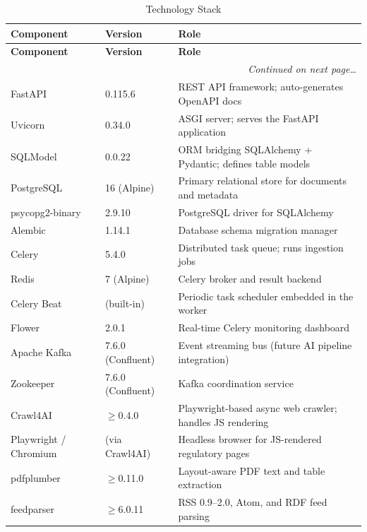 \documentclass[12pt,a4paper]{article}
\begin{document}
\begin{longtable}{@{}p{4cm} p{3cm} p{7.5cm}@{}}
\caption{Technology Stack}\label{tab:techstack}\\
\toprule
\textbf{Component} & \textbf{Version} & \textbf{Role} \\
\midrule
\endfirsthead
\toprule
\textbf{Component} & \textbf{Version} & \textbf{Role} \\
\midrule
\endhead
\midrule
\multicolumn{3}{r}{\small\textit{Continued on next page\ldots}}
\endfoot
\bottomrule
\endlastfoot
Python                & 3.11             & Primary runtime language \\
FastAPI               & 0.115.6          & REST API framework; auto-generates OpenAPI docs \\
Uvicorn               & 0.34.0           & ASGI server; serves the FastAPI application \\
SQLModel              & 0.0.22           & ORM bridging SQLAlchemy + Pydantic; defines table models \\
PostgreSQL            & 16 (Alpine)      & Primary relational store for documents and metadata \\
psycopg2-binary       & 2.9.10           & PostgreSQL driver for SQLAlchemy \\
Alembic               & 1.14.1           & Database schema migration manager \\
Celery                & 5.4.0            & Distributed task queue; runs ingestion jobs \\
Redis                 & 7 (Alpine)       & Celery broker and result backend \\
Celery Beat           & (built-in)       & Periodic task scheduler embedded in the worker \\
Flower                & 2.0.1            & Real-time Celery monitoring dashboard \\
Apache Kafka          & 7.6.0 (Confluent)& Event streaming bus (future AI pipeline integration) \\
Zookeeper             & 7.6.0 (Confluent)& Kafka coordination service \\
Crawl4AI              & $\geq$0.4.0     & Playwright-based async web crawler; handles JS rendering \\
Playwright / Chromium & (via Crawl4AI)   & Headless browser for JS-rendered regulatory pages \\
pdfplumber            & $\geq$0.11.0    & Layout-aware PDF text and table extraction \\
feedparser            & $\geq$6.0.11    & RSS 0.9--2.0, Atom, and RDF feed parsing \\

\end{longtable}
\end{document}
